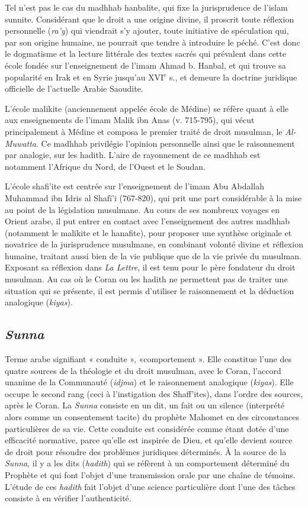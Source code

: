 Tel n’est pas le cas du madhhab hanbalite,
qui fixe la jurisprudence de l’islam
sunnite. Considérant que le droit a une
origine divine, il proscrit toute réflexion
personnelle ({\it ra’y}) qui viendrait s’y ajouter,
toute initiative de spéculation qui, par
son origine humaine, ne pourrait que
tendre à introduire le péché. C’est donc le
dogmatisme et la lecture littérale des
textes sacrés qui prévalent dans cette
école fondée sur l’enseignement de
l'imam Ahmad b. Hanbal, et qui trouve
sa popularité en Irak et en Syrie jusqu’au
{\footnotesize XVI}$^\text{e}$ s., et demeure la doctrine juridique
officielle de l’actuelle Arabie Saoudite.

L'école malikite (anciennement appelée
école de Médine) se réfère quant à
elle aux enseignements de l’imam Malik
ibn Anas (v. 715-795), qui vécut principalement
à Médine et composa le premier
traité de droit musulman, le {\it Al-Muwatta}.
Ce madhhab privilégie l’opinion personnelle
ainsi que le raisonnement par analogie,
sur les hadith. L’aire de rayonnement
de ce madhhab est notamment l’Afrique
du Nord, de l'Ouest et le Soudan.

L'école shafi’ite est centrée sur l’enseignement
de l’imam Abu Abdallah
Muhammad ibn Idris al Shafï’i (767-820),
qui prit une part considérable à la mise
au point de la législation musulmane. Au
cours de ses nombreux voyages en Orient
arabe, il put entrer en contact avec
l’enseignement des autres madhhab (notamment
le malikite et le hanafite), pour
proposer une synthèse originale et novatrice
de la jurisprudence musulmane, en
combinant volonté divine et réflexion
humaine, traitant aussi bien de la vie
publique que de la vie privée du musulman.
Exposant sa réflexion dans {\it La
Lettre}, il est tenu pour le père fondateur
du droit musulman. Au cas où le Coran
ou les hadith ne permettent pas de traiter
une situation qui se présente, il est permis
d'utiliser le raisonnement et la déduction
analogique ({\it kiyas}).



\subsection{{\it Sunna}}
Terme arabe signifiant « conduite »,
«comportement ». Elle constitue l’une
des quatre sources de la théologie et du
droit musulman, avec le Coran, l'accord
unanime de la Communauté ({\it idjma}) et le
raisonnement analogique ({\it kiyas}). Elle
occupe le second rang (ceci à l’instigation
des Shaff'ites), dans l’ordre des sources,
après le Coran. La {\it Sunna} consiste en un
dit, un fait ou un silence (interprété alors
comme un consentement tacite) du prophète
Mahomet en des circonstances particulières
de sa vie. Cette conduite est
considérée comme étant dotée d’une efficacité
normative, parce qu’elle est inspirée
de Dieu, et qu’elle devient source de
droit pour résoudre des problèmes juridiques
déterminés. À la source de la
{\it Sunna}, il y a les dits ({\it hadith}) qui se réfèrent
à un comportement déterminé du
Prophète et qui font l’objet d’une transmission
orale par une chaîne de témoins.
L'étude de ces {\it hadith} fait l’objet d’une
science particulière dont l’une des tâches
consiste à en vérifier l’authenticité.

